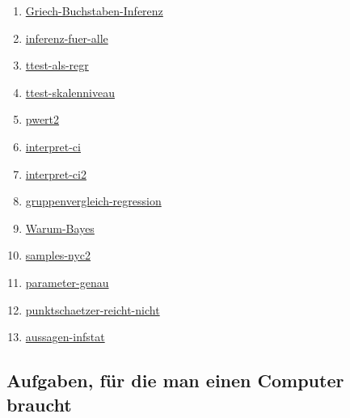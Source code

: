 \documentclass[
  ngerman,
  letterpaper,
  twoside,
  open=any]{scrbook}
\providecommand{\tightlist}{%
  \setlength{\itemsep}{0pt}\setlength{\parskip}{0pt}}\usepackage{longtable,booktabs,array}
\theoremstyle{definition}
\theoremstyle{plain}
\theoremstyle{definition}
\theoremstyle{definition}
\theoremstyle{remark}
\begin{document}
\begin{enumerate}
\def\labelenumi{\arabic{enumi}.}
\tightlist
\item
  \href{https://datenwerk.netlify.app/posts/griech-buchstaben-inferenz/griech-buchstaben-inferenz/}{Griech-Buchstaben-Inferenz}
\item
  \href{https://datenwerk.netlify.app/posts/inferenz-fuer-alle/inferenz-fuer-alle}{inferenz-fuer-alle}
\item
  \href{https://datenwerk.netlify.app/posts/ttest-als-regr/ttest-als-regr/}{ttest-als-regr}
\item
  \href{https://datenwerk.netlify.app/posts/ttest-skalenniveau/ttest-skalenniveau/}{ttest-skalenniveau}
\item
  \href{https://sebastiansauer.github.io/datenwerk/posts/pwert2/}{pwert2}
\item
  \href{https://sebastiansauer.github.io/datenwerk/posts/interpret-ci/}{interpret-ci}
\item
  \href{https://sebastiansauer.github.io/datenwerk/posts/interpret-ci2/}{interpret-ci2}
\item
  \href{https://sebastiansauer.github.io/datenwerk/posts/gruppenvergleich-regression/}{gruppenvergleich-regression}
\item
  \href{https://datenwerk.netlify.app/posts/warum-bayes/warum-bayes}{Warum-Bayes}
\item
  \href{https://datenwerk.netlify.app/posts/samples-nyc2/}{samples-nyc2}
\item
  \href{https://sebastiansauer.github.io/datenwerk/posts/parameter-genau/}{parameter-genau}
\item
  \href{https://datenwerk.netlify.app/posts/punktschaetzer-reicht-nicht/punktschaetzer-reicht-nicht.html}{punktschaetzer-reicht-nicht}
\item
  \href{https://sebastiansauer.github.io/datenwerk/posts/aussagen-infstat/index.html}{aussagen-infstat}
\end{enumerate}

\subsection{Aufgaben, für die man einen Computer
braucht}\label{aufgaben-fuxfcr-die-man-einen-computer-braucht}
\end{document}

